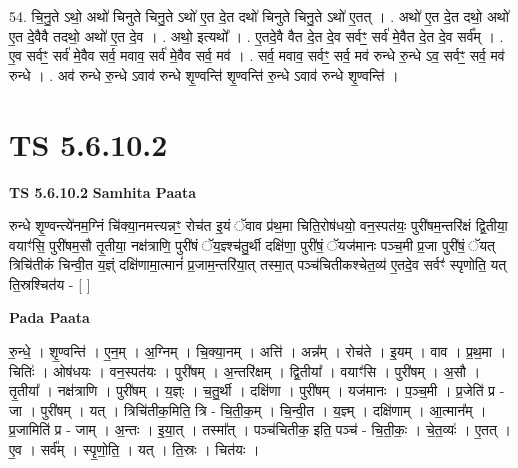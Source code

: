 \documentclass[17pt]{extarticle}
\begin{document}
54. चि॒नु॒ते ऽथो॒ अथो॑ चिनुते चिनु॒ते ऽथो॑ ए॒त दे॒त दथो॑ चिनुते चिनु॒ते ऽथो॑ ए॒तत् । . अथो॑ ए॒त दे॒त दथो॒ अथो॑ ए॒त दे॒वैवै तदथो॒ अथो॑ ए॒त दे॒व । . अथो॒ इत्यथो᳚ । . ए॒तदे॒वै वैत दे॒त दे॒व सर्वꣳ॒॒ सर्व॑ मे॒वैत दे॒त दे॒व सर्व᳚म् । . ए॒व सर्वꣳ॒॒ सर्व॑ मे॒वैव सर्व॒ मवाव॒ सर्व॑ मे॒वैव सर्व॒ मव॑ । . सर्व॒ मवाव॒ सर्वꣳ॒॒ सर्व॒ मव॑ रुन्धे रु॒न्धे ऽव॒ सर्वꣳ॒॒ सर्व॒ मव॑ रुन्धे । . अव॑ रुन्धे रु॒न्धे ऽवाव॑ रुन्धे शृ॒ण्वन्ति॑ शृ॒ण्वन्ति॑ रु॒न्धे ऽवाव॑ रुन्धे शृ॒ण्वन्ति॑ । \newline
\pagebreak
{}

\section{ TS 5.6.10.2 }

\textbf{TS 5.6.10.2 } \newline
\textbf{Samhita Paata} \newline

रुन्धे शृ॒ण्वन्त्ये॑नम॒ग्निं चि॑क्या॒नमत्त्यन्नꣳ॒॒ रोच॑त इ॒यं ॅवाव प्र॑थ॒मा चिति॒रोष॑धयो॒ वन॒स्पत॑यः॒ पुरी॑षम॒न्तरि॑क्षं द्वि॒तीया॒ वयाꣳ॑सि॒ पुरी॑षम॒सौ तृ॒तीया॒ नक्ष॑त्राणि॒ पुरी॑षं ॅय॒ज्ञ्श्च॑तु॒र्थी दक्षि॑णा॒ पुरी॑षं॒ ॅयज॑मानः पञ्च॒मी प्र॒जा पुरी॑षं॒ ॅयत् त्रिचि॑तीकं चिन्वी॒त य॒ज्ञ्ं दक्षि॑णामा॒त्मानं॑ प्र॒जाम॒न्तरि॑या॒त् तस्मा॒त् पञ्च॑चितीकश्चेत॒व्य॑ ए॒तदे॒व सर्वꣳ॑ स्पृणोति॒ यत् ति॒स्रश्चित॑य - [  ] \newline

\textbf{Pada Paata} \newline

रु॒न्धे॒ । शृ॒ण्वन्ति॑ । ए॒न॒म् । अ॒ग्निम् । चि॒क्या॒नम् । अत्ति॑ । अन्न᳚म् । रोच॑ते । इ॒यम् । वाव । प्र॒थ॒मा । चितिः॑ । ओष॑धयः । वन॒स्पत॑यः । पुरी॑षम् । अ॒न्तरि॑क्षम् । द्वि॒तीया᳚ । वयाꣳ॑सि । पुरी॑षम् । अ॒सौ । तृ॒तीया᳚ । नक्ष॑त्राणि । पुरी॑षम् । य॒ज्ञ्ः । च॒तु॒र्थी । दक्षि॑णा । पुरी॑षम् । यज॑मानः । प॒ञ्च॒मी । प्र॒जेति॑ प्र - जा । पुरी॑षम् । यत् । त्रिचि॑तीक॒मिति॒ त्रि - चि॒ती॒क॒म् । चि॒न्वी॒त । य॒ज्ञ्म् । दक्षि॑णाम् । आ॒त्मान᳚म् । प्र॒जामिति॑ प्र - जाम् । अ॒न्तः । इ॒या॒त् । तस्मा᳚त् । पञ्च॑चितीक॒ इति॒ पञ्च॑ - चि॒ती॒कः॒ । चे॒त॒व्यः॑ । ए॒तत् । ए॒व । सर्व᳚म् । स्पृ॒णो॒ति॒ । यत् । ति॒स्रः । चित॑यः ।  \newline
\end{document}
